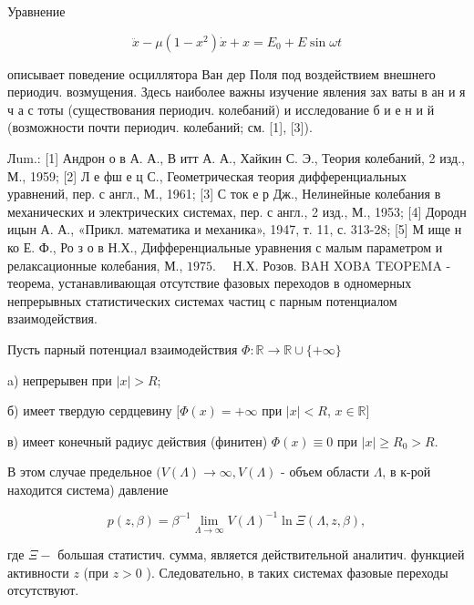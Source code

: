 \documentclass[10pt]{article}
\begin{document}
Уравнение



\[

\ddot{x}-\mu\left(1-x^{2}\right) \dot{x}+x=E_{0}+E \sin \omega t

\]



описывает поведение осциллятора Ван дер Поля под воздействием внешнего периодич. возмущения. Здесь наиболее важны изучение явления зах ваты в ан и я ч а с тоты (существования периодич. колебаний) и исследование б и е н и й (возможности почти периодич. колебаний; см. [1], [3]).



Лum.: [1] Андрон о в А. А., В итт А. А., Хайкин С. Э., Теория колебаний, 2 изд., М., 1959; [2] Л е фш е ц С., Геометрическая теория дифференциальных уравнений, пер. с англ., М., 1961; [3] С ток е р Дж., Нелинейные колебания в механических и электрических системах, пер. с англ., 2 изд., М., 1953; [4] Дородн ицын А. А., «Прикл. математика и механика», 1947, т. 11, с. 313-28; [5] М ище н ко Е. Ф., Ро з о в Н.Х., Дифференциальные уравнения с малым параметром и релаксационные колебания, М., $1975 . \quad$ Н.Х. Розов. BAH XOBA TEOPEMA - теорема, устанавливающая отсутствие фазовых переходов в одномерных непрерывных статистических системах частиц с парным потенциалом взаимодействия.



Пусть парный потенциал взаимодействия $\Phi: \mathbb{R} \rightarrow \mathbb{R} \cup\{+\infty\}$



a) непрерывен при $|x|>R$;



б) имеет твердую сердцевину $[\Phi(x)=+\infty$ при $|x|<R$, $x \in \mathbb{R}]$



в) имеет конечный радиус действия (финитен) $\Phi(x) \equiv 0$ при $|x| \geqslant R_{0}>R$.



В этом случае предельное $(V(\Lambda) \rightarrow \infty, V(\Lambda)$ - объем области $\Lambda$, в к-рой находится система) давление



\[

p(z, \beta)=\beta^{-1} \lim _{\Lambda \rightarrow \infty} V(\Lambda)^{-1} \ln \Xi(\Lambda, z, \beta),

\]



где $\Xi-$ большая статистич. сумма, является действительной аналитич. функцией активности $z$ (при $z>0$ ). Следовательно, в таких системах фазовые переходы отсутствуют.
\end{document}
